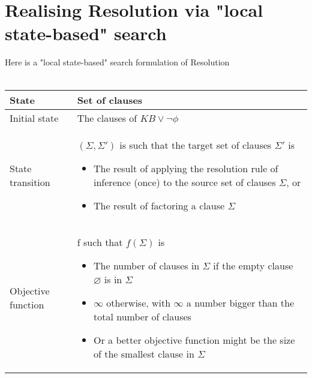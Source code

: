 \documentclass{article}[18pt]
\begin{document}
\section{Realising Resolution via "local state-based" search}
Here is a "local state-based" search formulation of Resolution\\
\\
{\renewcommand{\arraystretch}{2}
\begin{tabularx}{\textwidth}{|X|X|}
\hline
State & Set of clauses\\
\hline
Initial state & The clauses of $KB \lor \lnot \phi$\\
\hline
State transition & 
$(\Sigma,\Sigma')$ is such that the target set of clauses $\Sigma'$ is
\begin{itemize}
	\item The result of applying the resolution rule of inference (once) to the source set of clauses $\Sigma$, or
	\item The result of factoring a clause $\Sigma$
\end{itemize}
\\
\hline
Objective function &
f such that $f(\Sigma)$ is
\begin{itemize}
	\item The number of clauses in $\Sigma$ if the empty clause $\varnothing$ is in $\Sigma$
	\item $\infty$ otherwise, with $\infty$ a number bigger than the total number of clauses
	\item Or a better objective function might be the size of the smallest clause in $\Sigma$
\end{itemize}
\\
\hline
\end{tabularx}
}
\end{document}
